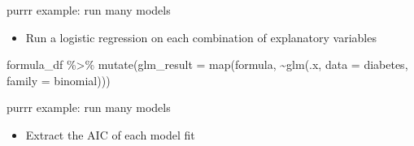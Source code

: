 \documentclass[
  ignorenonframetext,
]{beamer}
\newenvironment{Shaded}{\begin{snugshade}}{\end{snugshade}}
\newcommand{\AttributeTok}[1]{\textcolor[rgb]{0.77,0.63,0.00}{#1}}
\newcommand{\FunctionTok}[1]{\textcolor[rgb]{0.00,0.00,0.00}{#1}}
\newcommand{\NormalTok}[1]{#1}
\newcommand{\SpecialCharTok}[1]{\textcolor[rgb]{0.00,0.00,0.00}{#1}}
\newcommand{\StringTok}[1]{\textcolor[rgb]{0.31,0.60,0.02}{#1}}
\providecommand{\tightlist}{%
  \setlength{\itemsep}{0pt}\setlength{\parskip}{0pt}}
\begin{document}
\begin{frame}[fragile]{purrr example: run many models}
\protect\hypertarget{purrr-example-run-many-models-1}{}
\begin{itemize}
\tightlist
\item
  Run a logistic regression on each combination of explanatory variables
\end{itemize}

\begin{Shaded}
\begin{Highlighting}[]
\NormalTok{formula\_df }\SpecialCharTok{\%\textgreater{}\%} 
  \FunctionTok{mutate}\NormalTok{(}\AttributeTok{glm\_result =} \FunctionTok{map}\NormalTok{(formula,}
                          \SpecialCharTok{\textasciitilde{}}\FunctionTok{glm}\NormalTok{(.x, }\AttributeTok{data =}\NormalTok{ diabetes, }\AttributeTok{family =} \StringTok{\textquotesingle{}binomial\textquotesingle{}}\NormalTok{))) }
\end{Highlighting}
\end{Shaded}
\end{frame}

\begin{frame}[fragile]{purrr example: run many models}
\protect\hypertarget{purrr-example-run-many-models-2}{}
\begin{itemize}
\tightlist
\item
  Extract the AIC of each model fit
\end{itemize}

\begin{Shaded}
\end{Shaded}
\end{frame}
\end{document}
